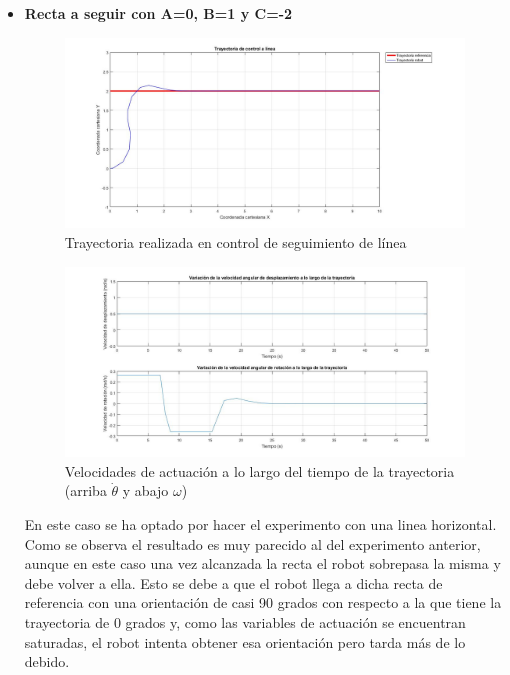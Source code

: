 \documentclass[a4paper,twoside]{article}
\begin{document}
\begin{itemize}
	\item \textbf{Recta a seguir con A=0, B=1 y C=-2}
	\begin{figure}[H]
		\centering
		\includegraphics[width=1\textwidth]{control_linea_2}
		\caption{Trayectoria realizada en control de seguimiento de línea}
	\end{figure}
	\begin{figure}[H]
		\centering
		\includegraphics[width=1\textwidth]{control_linea_2_2}
		\caption{Velocidades de actuación a lo largo del tiempo de la trayectoria (arriba $\dot{\theta}$ y abajo $\omega$)}
	\end{figure}
	En este caso se ha optado por hacer el experimento con una linea horizontal. Como se observa el resultado es muy parecido al del experimento anterior, aunque en este caso una vez alcanzada la recta el robot sobrepasa la misma y debe volver a ella. Esto se debe a que el robot llega a dicha recta de referencia con una orientación de casi 90 grados con respecto a la que tiene la trayectoria de 0 grados y, como las variables de actuación se encuentran saturadas, el robot intenta obtener esa orientación pero tarda más de lo debido.
	\end{itemize}
\end{document}
